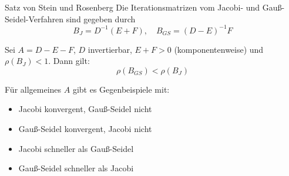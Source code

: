 \begin{defi}{Satz von Stein und Rosenberg}
    Die Iterationsmatrizen vom Jacobi- und Gauß-Seidel-Verfahren sind gegeben durch
    \[
        B_{J} = D^{-1} (E + F), \quad B_{GS} = (D - E)^{-1} F
    \]

    Sei $A = D - E - F$, $D$ invertierbar, $E + F > 0$ (komponentenweise) und $\rho(B_{J}) < 1$.
    Dann gilt:
    \[
        \rho(B_{GS}) < \rho(B_{J})
    \]

    Für allgemeines $A$ gibt es Gegenbeispiele mit:
    \begin{itemize}
        \item Jacobi konvergent, Gauß-Seidel nicht
        \item Gauß-Seidel konvergent, Jacobi nicht
        \item Jacobi schneller als Gauß-Seidel
        \item Gauß-Seidel schneller als Jacobi
    \end{itemize}
\end{defi}

